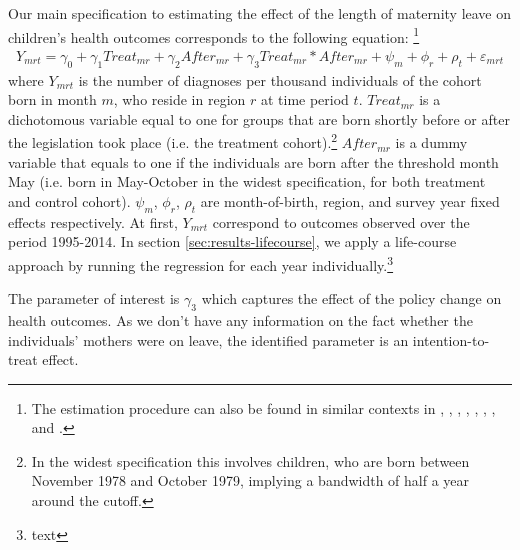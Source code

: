 \documentclass[11pt, a4paper]{article} %
\begin{document}
Our main specification to estimating the effect of the length of maternity leave on children's health outcomes corresponds to the following equation: \footnote{The estimation procedure can also be found in similar contexts in \cite{RafaelLaliveandJosefZweimuller2009}, \cite{Dustmann2012}, \cite{Ekberg2013}, \cite{schonberg2014expansions}, \cite{Lalive2014}, \cite{Huebener2017}, \cite{danzer2017}, and \cite{guertzgen2018}.}
\begin{align}
Y_{mrt} = \gamma_0 + \gamma_1 Treat_{mr} + \gamma_2 After_{mr} + \gamma_3 Treat_{mr} * After_{mr} + \psi_m + \phi_r + \rho_t + \varepsilon_{mrt}
\end{align}
where $Y_{mrt}$ is the number of diagnoses per thousand individuals of the cohort born in month $m$, who reside in region $r$ at time period $t$. $Treat_{mr}$ is a dichotomous variable equal to one for groups that are born shortly before or after the legislation took place (i.e. the treatment cohort).\footnote{In the widest specification this involves children, who are born between November 1978 and October 1979, implying a bandwidth of half a year around the cutoff.} $After_{mr}$ is a dummy variable that equals to one if the individuals are born after the threshold month May (i.e. born in May-October in the widest specification, for both treatment and control cohort). $\psi_m$, $\phi_r$, $\rho_t$ are month-of-birth, region, and survey year fixed effects respectively. At first, $Y_{mrt}$ correspond to outcomes observed over the period 1995-2014. In section \ref{sec:results-lifecourse}, we apply a life-course approach by running the regression for each year individually.\footnote{text} 


The parameter of interest is $\gamma_3$ which captures the effect of the policy change on health outcomes. As we don't have any information on the fact whether the individuals' mothers were on leave, the identified parameter is an intention-to-treat effect. \newline
\end{document}
